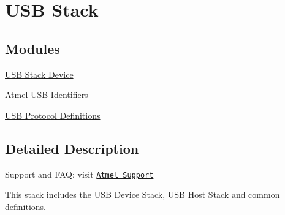 \hypertarget{group__usb__group}{\section{U\-S\-B Stack}
\label{group__usb__group}
}
\subsection*{Modules}
\begin{DoxyCompactItemize}
\item 
\hyperlink{group__usb__device__group}{U\-S\-B Stack Device}
\item 
\hyperlink{group__usb__atmel__ids__group}{Atmel U\-S\-B Identifiers}
\item 
\hyperlink{group__usb__protocol__group}{U\-S\-B Protocol Definitions}
\end{DoxyCompactItemize}


\subsection{Detailed Description}
Support and F\-A\-Q\-: visit \href{http://www.atmel.com/design-support/}{\tt Atmel Support}

This stack includes the U\-S\-B Device Stack, U\-S\-B Host Stack and common definitions. 